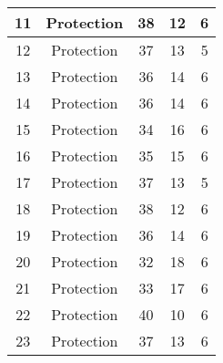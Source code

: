 \documentclass[results.tex]{subfiles}
\begin{document}
\begin{center}
\begin{tabular}{| c || c | c | c | c |}
            \hline
            11                      & Protection                   & 38                     & 12                      & 6                    \\
            \hline
            12                      & Protection                   & 37                     & 13                      & 5                    \\
            \hline
            13                      & Protection                   & 36                     & 14                      & 6                    \\
            \hline
            14                      & Protection                   & 36                     & 14                      & 6                    \\
            \hline
            15                      & Protection                   & 34                     & 16                      & 6                    \\
            \hline
            16                      & Protection                   & 35                     & 15                      & 6                    \\
            \hline
            17                      & Protection                   & 37                     & 13                      & 5                    \\
            \hline
            18                      & Protection                   & 38                     & 12                      & 6                    \\
            \hline
            19                      & Protection                   & 36                     & 14                      & 6                    \\
            \hline
            20                      & Protection                   & 32                     & 18                      & 6                    \\
            \hline
            21                      & Protection                   & 33                     & 17                      & 6                    \\
            \hline
            22                      & Protection                   & 40                     & 10                      & 6                    \\
            \hline
            23                      & Protection                   & 37                     & 13                      & 6                    \\

\end{tabular}
\end{center}
\end{document}
